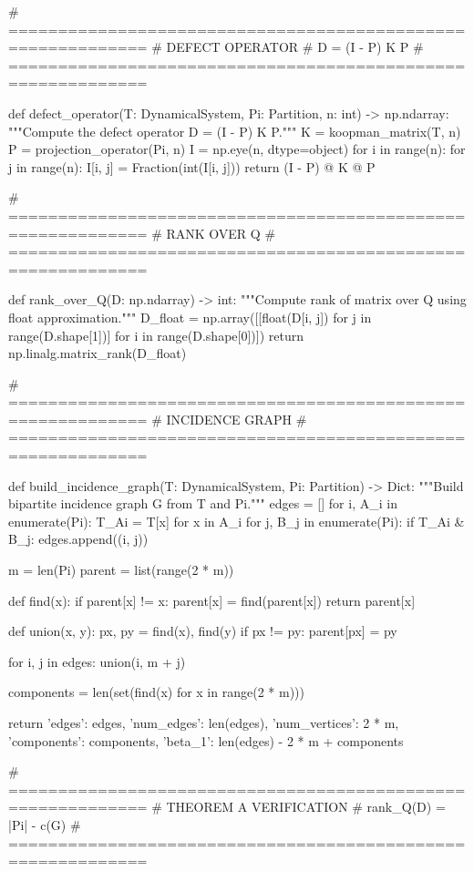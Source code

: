 # ============================================================
# DEFECT OPERATOR
# D = (I - P) K P
# ============================================================

def defect_operator(T: DynamicalSystem, Pi: Partition, n: int) -> np.ndarray:
    """Compute the defect operator D = (I - P) K P."""
    K = koopman_matrix(T, n)
    P = projection_operator(Pi, n)
    I = np.eye(n, dtype=object)
    for i in range(n):
        for j in range(n):
            I[i, j] = Fraction(int(I[i, j]))
    return (I - P) @ K @ P

# ============================================================
# RANK OVER Q
# ============================================================

def rank_over_Q(D: np.ndarray) -> int:
    """Compute rank of matrix over Q using float approximation."""
    D_float = np.array([[float(D[i, j]) for j in range(D.shape[1])] 
                        for i in range(D.shape[0])])
    return np.linalg.matrix_rank(D_float)

# ============================================================
# INCIDENCE GRAPH
# ============================================================

def build_incidence_graph(T: DynamicalSystem, Pi: Partition) -> Dict:
    """Build bipartite incidence graph G from T and Pi."""
    edges = []
    for i, A_i in enumerate(Pi):
        T_Ai = {T[x] for x in A_i}
        for j, B_j in enumerate(Pi):
            if T_Ai & B_j:
                edges.append((i, j))
    
    m = len(Pi)
    parent = list(range(2 * m))
    
    def find(x):
        if parent[x] != x:
            parent[x] = find(parent[x])
        return parent[x]
    
    def union(x, y):
        px, py = find(x), find(y)
        if px != py:
            parent[px] = py
    
    for i, j in edges:
        union(i, m + j)
    
    components = len(set(find(x) for x in range(2 * m)))
    
    return {
        'edges': edges,
        'num_edges': len(edges),
        'num_vertices': 2 * m,
        'components': components,
        'beta_1': len(edges) - 2 * m + components
    }

# ============================================================
# THEOREM A VERIFICATION
# rank_Q(D) = |Pi| - c(G)
# ============================================================

